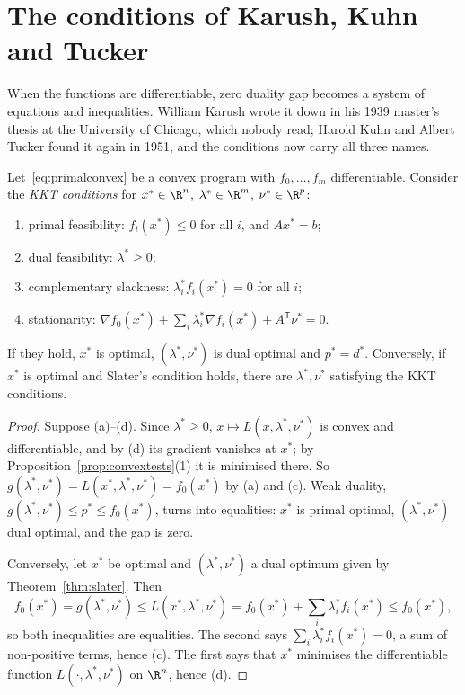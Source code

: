 \section{The conditions of Karush, Kuhn and Tucker}\label{sec:kkt}

When the functions are differentiable, zero duality gap becomes a system of equations and inequalities. William Karush wrote it down in his 1939 master's
thesis at the University of Chicago, which nobody read; Harold Kuhn and Albert Tucker found it again in 1951, and the conditions now carry all three names.

\begin{theorem}\label{thm:kkt}
Let~\eqref{eq:primalconvex} be a convex program with $f_0,\dots,f_m$ differentiable. Consider the \emph{KKT conditions} for $x^*\in\R^n$, $\lambda^*\in\R^m$, $\nu^*\in\R^p$:
\begin{enumerate}
\item[(a)] primal feasibility: $f_i(x^*)\le0$ for all $i$, and $Ax^*=b$;
\item[(b)] dual feasibility: $\lambda^*\ge0$;
\item[(c)] complementary slackness: $\lambda_i^*f_i(x^*)=0$ for all $i$;
\item[(d)] stationarity: $\nabla f_0(x^*)+\sum_i\lambda_i^*\nabla f_i(x^*)+A^{\mathsf T}\nu^*=0$.
\end{enumerate}
If they hold, $x^*$ is optimal, $(\lambda^*,\nu^*)$ is dual optimal and $p^*=d^*$. Conversely, if $x^*$ is optimal and Slater's condition holds, there are $\lambda^*,\nu^*$
satisfying the KKT conditions.
\end{theorem}
\begin{proof}
Suppose (a)--(d). Since $\lambda^*\ge0$, $x\mapsto L(x,\lambda^*,\nu^*)$ is convex and differentiable, and by (d) its gradient vanishes at $x^*$; by Proposition~\ref{prop:convextests}(1)
it is minimised there. So $g(\lambda^*,\nu^*)=L(x^*,\lambda^*,\nu^*)=f_0(x^*)$ by (a) and (c). Weak duality, $g(\lambda^*,\nu^*)\le p^*\le f_0(x^*)$, turns into equalities: $x^*$ is primal
optimal, $(\lambda^*,\nu^*)$ dual optimal, and the gap is zero.

Conversely, let $x^*$ be optimal and $(\lambda^*,\nu^*)$ a dual optimum given by Theorem~\ref{thm:slater}. Then
\[
f_0(x^*)=g(\lambda^*,\nu^*)\le L(x^*,\lambda^*,\nu^*)=f_0(x^*)+\sum_i\lambda_i^*f_i(x^*)\le f_0(x^*),
\]
so both inequalities are equalities. The second says $\sum_i\lambda_i^*f_i(x^*)=0$, a sum of non-positive terms, hence (c). The first says that $x^*$ minimises the differentiable
function $L(\cdot,\lambda^*,\nu^*)$ on $\R^n$, hence (d).
\end{proof}

